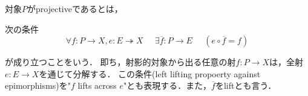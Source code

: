 \documentclass[uplatex, 12pt, dvipdfmx]{jsarticle}
\begin{document}
\begin{definition*}[射影的対象]\label{def-projective-object}対象$P$がprojectiveであるとは，

    次の条件
    \[ \forall f:P\to X, e:E\twoheadrightarrow X \;\;\;\;\; \exists \overline{f}:P\to E\;\;\;\;\; (e\circ\overline{f}=f) \]
    \begin{center}
    \end{center}
    が成り立つことをいう．
    即ち，射影的対象から出る任意の射$f:P\to X$は，全射$e:E\to X$を通じて分解する．
    この条件(left lifting propoerty against epimorphisms)を"$f$ lifts across $e$"とも表現する．また，$\overline{f}$をliftとも言う．
\end{definition*}
\vspace{1cm}
\end{document}
